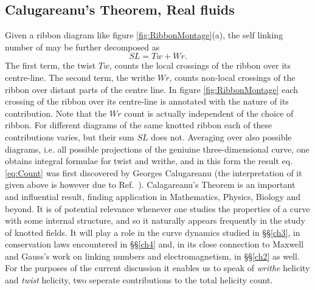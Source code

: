 \subsection{Calugareanu's Theorem, Real fluids}
Given a ribbon diagram like figure \ref{fig:RibbonMontage}(a), the self linking number of may be further decomposed as
\begin{equation}
    SL = Tw + Wr.
    \label{eq:Count}
\end{equation}
The first term, the twist $Tw$, counts the local crossings of the ribbon over its centre-line. The second term, the writhe $Wr$, counts non-local crossings of the ribbon over distant parts of the centre line. In figure \ref{fig:RibbonMontage} each crossing of the ribbon over its centre-line is annotated with the nature of its contribution. Note that the $Wr$ count is actually independent of the choice of ribbon. For different diagrams of the same knotted ribbon each of these contributions varies, but their sum $SL$ does not. Averaging over also possible diagrams, i.e. all possible projections of the geniuine three-dimensional curve, one obtains integral formulae for twist and writhe, and in this form the result eq. \ref{eq:Count} was first discovered by Georges Calugareanu \citep{Calugareanu1959,Calugareanu1961} (the interpretation of it given above is however due to Ref.~\citep{Dennis2005}). Calagareanu's Theorem is an important and influential result, finding application in Mathematics, Physics, Biology and beyond. It is of potential relevance whenever one studies the properties of a curve with some internal structure, and so it naturally appears frequently in the study of knotted fields. It will play a role in the curve dynamics studied in \S\S\ref{ch3}, in conservation laws encountered in \S\S\ref{ch4} and, in its close connection to Maxwell and Gauss's work on linking numbers and electromagnetism, in \S\S\ref{ch2} as well. For the purposes of the current discussion it enables us to speak of \emph{writhe} helicity and \emph{twist} helicity, two seperate contributions to the total helicity count.    

